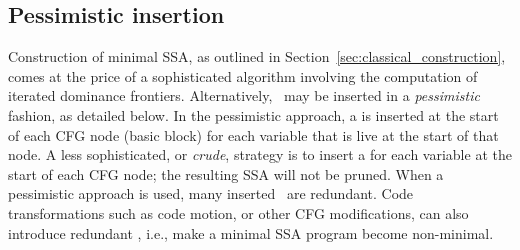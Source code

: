 {\subsection{Pessimistic \phifun insertion}
\label{sec:pessimistic-phifun-insertion}
Construction of minimal SSA, as outlined in Section~\ref{sec:classical_construction}, comes at the price of a sophisticated algorithm involving the computation of iterated dominance frontiers. 
Alternatively, \phifuns\ may be inserted in a \textit{pessimistic} fashion, as detailed below. In the pessimistic approach, a \phifun is inserted at the start of each CFG node (basic block) for each variable that is live at the start of that node. 
A less sophisticated, or \textit{crude}, strategy is to insert a \phifun for each variable at the start of each CFG node; 
the resulting SSA will not be pruned. 
When a pessimistic approach is used, many inserted \phifuns\ are redundant. 
Code transformations such as code motion, or other CFG modifications, can also introduce redundant \phifuns, i.e., make a minimal SSA program become non-minimal.

}
